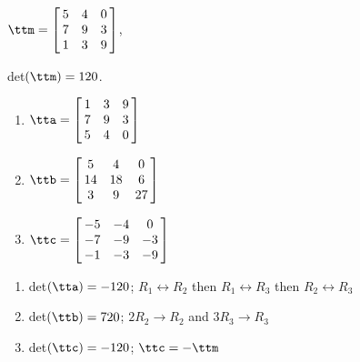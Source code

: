 {$\ttm=\left[\hskip -3pt \begin{array}{ccc} 5&4&0\\  7&9&3
\\  1&3&9\end{array}\hskip -3pt \right] $,

 det$(\ttm)=120$.
\begin{enumerate}
\item $\tta = \left[\hskip -3pt \begin{array}{ccc} 1&3&9\\  7&9&3
\\  5&4&0\end{array}\hskip -3pt \right] $
\item	$\ttb = \left[\hskip -3pt \begin{array}{ccc} 5&4&0\\  14&18&6
\\  3&9&27\end{array}\hskip -3pt \right]$
\item	$\ttc = \left[\hskip -3pt \begin{array}{ccc} -5&-4&0\\  -7&-9&-3
\\  -1&-3&-9\end{array}\hskip -3pt \right] $
\end{enumerate}} 
{\begin{enumerate}
\item det$(\tta) = -120$; $R_1\leftrightarrow R_2$ then $R_1\leftrightarrow R_3$ then $R_2\leftrightarrow R_3$
\item det$(\ttb) = 720$; $2R_2\rightarrow R_2$ and $3R_3\rightarrow R_3$
\item det$(\ttc) = -120$; $\ttc = -\ttm$
\end{enumerate}}



  

